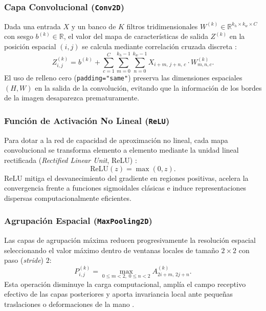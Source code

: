 \subsubsection{Capa Convolucional (\texttt{Conv2D})}
Dada una entrada $X$ y un banco de $K$ filtros tridimensionales $W^{(k)} \in \mathbb{R}^{k_h \times k_w \times C}$ con sesgo $b^{(k)} \in \mathbb{R}$, el valor del mapa de características de salida $Z^{(k)}$ en la posición espacial $(i, j)$ se calcula mediante correlación cruzada discreta \cite{Goodfellow2016}:
\begin{equation}
    Z^{(k)}_{i,j} = b^{(k)} + \sum_{c=1}^{C} \sum_{m=0}^{k_h-1} \sum_{n=0}^{k_w-1} X_{i+m,\, j+n,\, c} \cdot W^{(k)}_{m,n,c}.
\end{equation}
El uso de relleno cero (\texttt{padding="same"}) preserva las dimensiones espaciales $(H, W)$ en la salida de la convolución, evitando que la información de los bordes de la imagen desaparezca prematuramente.

\subsubsection{Función de Activación No Lineal (\texttt{ReLU})}
Para dotar a la red de capacidad de aproximación no lineal, cada mapa convolucional se transforma elemento a elemento mediante la unidad lineal rectificada (\textit{Rectified Linear Unit}, ReLU) \cite{Krizhevsky2012, He2015}:
\begin{equation}
    \text{ReLU}(z) = \max(0, z).
\end{equation}
ReLU mitiga el desvanecimiento del gradiente en regiones positivas, acelera la convergencia frente a funciones sigmoidales clásicas e induce representaciones dispersas computacionalmente eficientes.

\subsubsection{Agrupación Espacial (\texttt{MaxPooling2D})}
Las capas de agrupación máxima reducen progresivamente la resolución espacial seleccionando el valor máximo dentro de ventanas locales de tamaño $2 \times 2$ con paso (\textit{stride}) $2$:
\begin{equation}
    P^{(k)}_{i,j} = \max_{0 \le m < 2,\; 0 \le n < 2} A^{(k)}_{2i+m,\, 2j+n}.
\end{equation}
Esta operación disminuye la carga computacional, amplía el campo receptivo efectivo de las capas posteriores y aporta invariancia local ante pequeñas traslaciones o deformaciones de la mano \cite{Chollet2021}.

